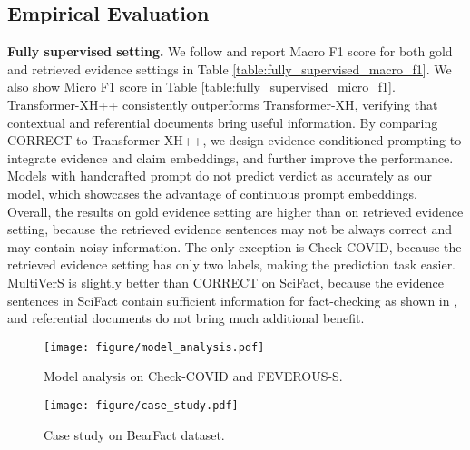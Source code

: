\subsection{Empirical Evaluation}

\textbf{Fully supervised setting.} We follow \cite{multivers} and report Macro F1 score for both gold and retrieved evidence settings in Table \ref{table:fully_supervised_macro_f1}. We also show Micro F1 score in Table \ref{table:fully_supervised_micro_f1}. Transformer-XH++ consistently outperforms Transformer-XH, verifying that contextual and referential documents bring useful information. By comparing CORRECT to Transformer-XH++, we design evidence-conditioned prompting to integrate evidence and claim embeddings, and further improve the performance. Models with handcrafted prompt do not predict verdict as accurately as our model, which showcases the advantage of continuous prompt embeddings. Overall, the results on gold evidence setting are higher than on retrieved evidence setting, because the retrieved evidence sentences may not be always correct and may contain noisy information. The only exception is Check-COVID, because the retrieved evidence setting has only two labels, making the prediction task easier. MultiVerS is slightly better than CORRECT on SciFact, because the evidence sentences in SciFact contain sufficient information for fact-checking as shown in \cite{scifact,multivers}, and referential documents do not bring much additional benefit.

\begin{figure*}[t]
	\centering
	\texttt{[image: figure/model\_analysis.pdf]}
	\caption{Model analysis on Check-COVID and FEVEROUS-S.}
	\label{fig:model_analysis}
\end{figure*}

\begin{figure}[t]
	\centering
	\texttt{[image: figure/case\_study.pdf]}
	\caption{Case study on BearFact dataset.}
	\label{fig:case_study}
\end{figure}

